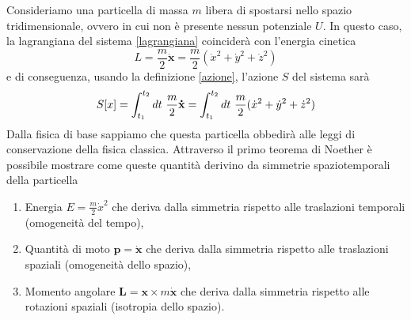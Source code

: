 \begin{example}
    Consideriamo una particella di massa $m$ libera di spostarsi nello spazio tridimensionale, ovvero in cui non è presente nessun potenziale $U$. In questo caso, la lagrangiana del sistema \eqref{lagrangiana} coinciderà con l'energia cinetica 
\begin{equation} \label{lag2}
    L = \frac{m}{2} \mathbf{\dot x} = \frac{m}{2} (\dot x^2 + \dot y^2 + \dot z^2)
\end{equation}
    e di conseguenza, usando la definizione \eqref{azione}, l'azione $S$ del sistema sarà
\begin{equation}
    S[x] = \int_{t_1}^{t_2}dt~ \frac{m}{2} \mathbf{\dot x} = \int_{t_1}^{t_2}dt~ \frac{m}{2} (\dot x^2 + \dot y^2 + \dot z^2)
\end{equation}
    Dalla fisica di base sappiamo che questa particella obbedirà alle leggi di conservazione della fisica classica. Attraverso il primo teorema di Noether è possibile mostrare come queste quantità derivino da simmetrie spaziotemporali della particella
\begin{enumerate}
    \item Energia $E = \frac{m}{2} \dot x^2$ che deriva dalla simmetria rispetto alle traslazioni temporali (omogeneità del tempo),
    \item Quantità di moto $\mathbf p = \mathbf{\dot x}$ che deriva dalla simmetria rispetto alle traslazioni spaziali (omogeneità dello spazio),
    \item Momento angolare $\mathbf L = \mathbf x \times m \mathbf{\dot x}$ che deriva dalla simmetria rispetto alle rotazioni spaziali (isotropia dello spazio).
\end{enumerate}


\end{example}
